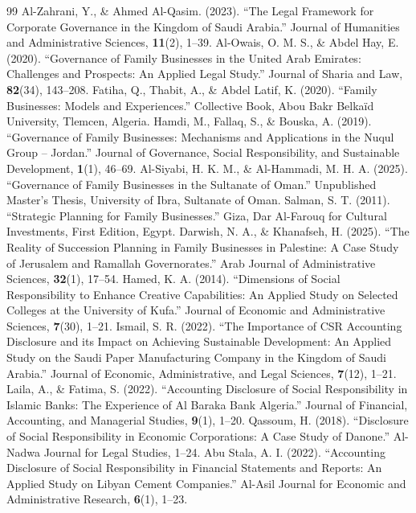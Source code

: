 \documentclass{NSP1}
\begin{document}
\begin{thebibliography}{99}
 Al-Zahrani, Y., \& Ahmed Al-Qasim. (2023). ``The Legal Framework for Corporate Governance in the Kingdom of Saudi Arabia.'' Journal of Humanities and Administrative Sciences, \textbf{11}(2), 1--39.
 Al-Owais, O. M. S., \& Abdel Hay, E. (2020). ``Governance of Family Businesses in the United Arab Emirates: Challenges and Prospects: An Applied Legal Study.'' Journal of Sharia and Law, \textbf{82}(34), 143--208.
 Fatiha, Q., Thabit, A., \& Abdel Latif, K. (2020). ``Family Businesses: Models and Experiences.'' Collective Book, Abou Bakr Belka\"id University, Tlemcen, Algeria.
 Hamdi, M., Fallaq, S., \& Bouska, A. (2019). ``Governance of Family Businesses: Mechanisms and Applications in the Nuqul Group -- Jordan.'' Journal of Governance, Social Responsibility, and Sustainable Development, \textbf{1}(1), 46--69.
 Al-Siyabi, H. K. M., \& Al-Hammadi, M. H. A. (2025). ``Governance of Family Businesses in the Sultanate of Oman.'' Unpublished Master's Thesis, University of Ibra, Sultanate of Oman.
 Salman, S. T. (2011). ``Strategic Planning for Family Businesses.'' Giza, Dar Al-Farouq for Cultural Investments, First Edition, Egypt.
 Darwish, N. A., \& Khanafseh, H. (2025). ``The Reality of Succession Planning in Family Businesses in Palestine: A Case Study of Jerusalem and Ramallah Governorates.'' Arab Journal of Administrative Sciences, \textbf{32}(1), 17--54.
 Hamed, K. A. (2014). ``Dimensions of Social Responsibility to Enhance Creative Capabilities: An Applied Study on Selected Colleges at the University of Kufa.'' Journal of Economic and Administrative Sciences, \textbf{7}(30), 1--21.
 Ismail, S. R. (2022). ``The Importance of CSR Accounting Disclosure and its Impact on Achieving Sustainable Development: An Applied Study on the Saudi Paper Manufacturing Company in the Kingdom of Saudi Arabia.'' Journal of Economic, Administrative, and Legal Sciences, \textbf{7}(12), 1--21.
 Laila, A., \& Fatima, S. (2022). ``Accounting Disclosure of Social Responsibility in Islamic Banks: The Experience of Al Baraka Bank Algeria.'' Journal of Financial, Accounting, and Managerial Studies, \textbf{9}(1), 1--20.
 Qassoum, H. (2018). ``Disclosure of Social Responsibility in Economic Corporations: A Case Study of Danone.'' Al-Nadwa Journal for Legal Studies, 1--24.
 Abu Stala, A. I. (2022). ``Accounting Disclosure of Social Responsibility in Financial Statements and Reports: An Applied Study on Libyan Cement Companies.'' Al-Asil Journal for Economic and Administrative Research, \textbf{6}(1), 1--23.

\end{thebibliography}
\end{document}
